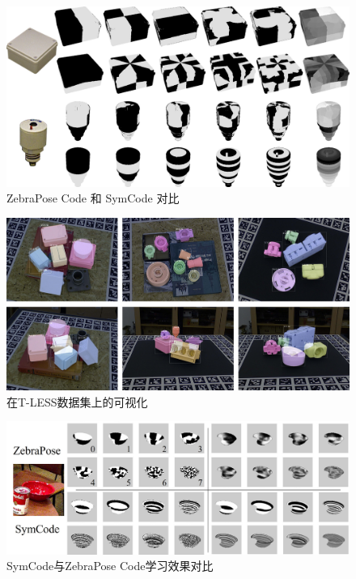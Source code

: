 \begin{figure}[htbp]
        \centerline{\includegraphics[width=1.0\textwidth]{figure/symnet/compare_code_map.jpg}}
        \caption{ZebraPose Code 和 SymCode 对比}
        \label{fig:compare_code_map}
\end{figure}

\begin{figure}[ht]
        \centerline{\includegraphics[width=1.0\textwidth]{figure/symnet/visualization_tless.jpg}}
        \caption{在T-LESS数据集上的可视化}
        \label{fig:visualization_tless}
\end{figure}

\begin{figure}[h]
        \centerline{\includegraphics[width=1.0\textwidth]{figure/symnet/compare_with_zebrapose.jpg}}
        \caption{SymCode与ZebraPose Code学习效果对比}
        \label{fig:compare_zebrapose}
\end{figure}

